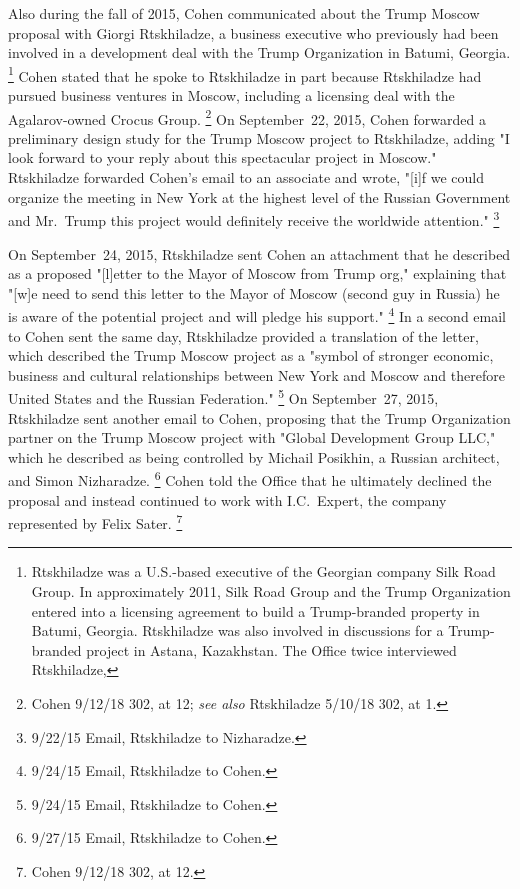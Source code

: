 Also during the fall of 2015, Cohen communicated about the Trump Moscow proposal with Giorgi Rtskhiladze, a business executive who previously had been involved in a development deal with the Trump Organization in Batumi, Georgia.%
\footnote{Rtskhiladze was a U.S.-based executive of the Georgian company Silk Road Group.
In approximately 2011, Silk Road Group and the Trump Organization entered into a licensing agreement to build a Trump-branded property in Batumi, Georgia.
Rtskhiladze was also involved in discussions for a Trump-branded project in Astana, Kazakhstan.
The Office twice interviewed Rtskhiladze, }
Cohen stated that he spoke to Rtskhiladze in part because Rtskhiladze had pursued business ventures in Moscow, including a licensing deal with the Agalarov-owned Crocus Group.%
\footnote{Cohen 9/12/18 302, at 12;
\textit{see also} Rtskhiladze 5/10/18 302, at 1.}
On September~22, 2015, Cohen forwarded a preliminary design study for the Trump Moscow project to Rtskhiladze, adding "I look forward to your reply about this spectacular project in Moscow."
Rtskhiladze forwarded Cohen's email to an associate and wrote, "[i]f we could organize the meeting in New York at the highest level of the Russian Government and Mr.~Trump this project would definitely receive the worldwide attention."%
\footnote{9/22/15 Email, Rtskhiladze to Nizharadze.}

On September~24, 2015, Rtskhiladze sent Cohen an attachment that he described as a proposed "[l]etter to the Mayor of Moscow from Trump org," explaining that "[w]e need to send this letter to the Mayor of Moscow (second guy in Russia) he is aware of the potential project and will pledge his support."%
\footnote{9/24/15 Email, Rtskhiladze to Cohen.}
In a second email to Cohen sent the same day, Rtskhiladze provided a translation of the letter, which described the Trump Moscow project as a "symbol of stronger economic, business and cultural relationships between New York and Moscow and therefore United States and the Russian Federation."%
\footnote{9/24/15 Email, Rtskhiladze to Cohen.}
On September~27, 2015, Rtskhiladze sent another email to Cohen, proposing that the Trump Organization partner on the Trump Moscow project with "Global Development Group LLC," which he described as being controlled by Michail Posikhin, a Russian architect, and Simon Nizharadze.%
\footnote{9/27/15 Email, Rtskhiladze to Cohen.}
Cohen told the Office that he ultimately declined the proposal and instead continued to work with I.C.~Expert, the company represented by Felix Sater.%
\footnote{Cohen 9/12/18 302, at 12.}

